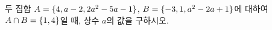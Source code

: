두 집합 $A=\{4{,}\mkern3mu\mathopen{}a-2{,}\mkern3mu\mathopen{}2a^2-5a-1\}$, $B=\{-3{,}\mkern3mu\mathopen{}1{,}\mkern3mu\mathopen{}a^2-2a+1\}$에 대하여 $A\cap B=\{1{,}\mkern3mu\mathopen{}4\}$일 때, 상수 $a$의 값을 구하시오.
